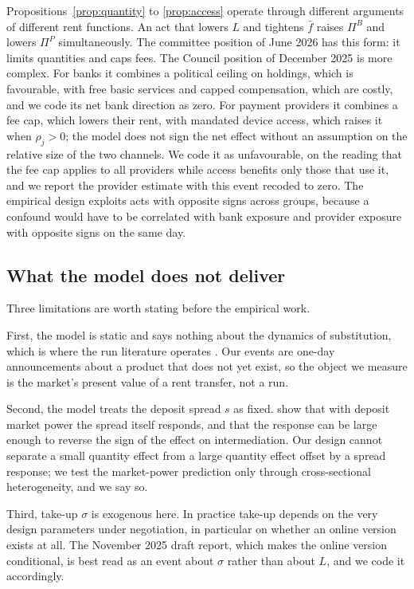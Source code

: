 \documentclass[11pt]{article}
\theoremstyle{plain}\newtheorem{proposition}{Proposition}
\begin{document}
Propositions~\ref{prop:quantity} to \ref{prop:access} operate through different arguments of different rent functions. An act that lowers $L$ and tightens $\bar f$ raises $\Pi^B$ and lowers $\Pi^P$ simultaneously. The committee position of June 2026 has this form: it limits quantities and caps fees. The Council position of December 2025 is more complex. For banks it combines a political ceiling on holdings, which is favourable, with free basic services and capped compensation, which are costly, and we code its net bank direction as zero. For payment providers it combines a fee cap, which lowers their rent, with mandated device access, which raises it when $\rho_j>0$; the model does not sign the net effect without an assumption on the relative size of the two channels. We code it as unfavourable, on the reading that the fee cap applies to all providers while access benefits only those that use it, and we report the provider estimate with this event recoded to zero. The empirical design exploits acts with opposite signs across groups, because a confound would have to be correlated with bank exposure and provider exposure with opposite signs on the same day.

\subsection{What the model does not deliver}

Three limitations are worth stating before the empirical work.

First, the model is static and says nothing about the dynamics of substitution, which is where the run literature operates \citep{bidder2024}. Our events are one-day announcements about a product that does not yet exist, so the object we measure is the market's present value of a rent transfer, not a run.

Second, the model treats the deposit spread $s$ as fixed. \citet{chiu2023} show that with deposit market power the spread itself responds, and that the response can be large enough to reverse the sign of the effect on intermediation. Our design cannot separate a small quantity effect from a large quantity effect offset by a spread response; we test the market-power prediction only through cross-sectional heterogeneity, and we say so.

Third, take-up $\sigma$ is exogenous here. In practice take-up depends on the very design parameters under negotiation, in particular on whether an online version exists at all. The November 2025 draft report, which makes the online version conditional, is best read as an event about $\sigma$ rather than about $L$, and we code it accordingly.
\end{document}

